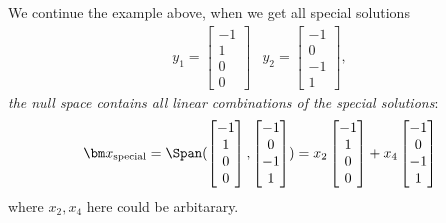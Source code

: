 \begin{itemize}
\begin{example}
We continue the example above, when we get all special solutions 
\[
\begin{array}{ll}
y_1 = \begin{bmatrix}
-1\\1\\0\\0
\end{bmatrix}
&
y_2 = \begin{bmatrix}
-1\\0\\-1\\1
\end{bmatrix},
\end{array}
\] 
\emph{the null space contains all linear combinations of the special solutions}:
\[
\bm x_{\text{special}} = \Span(\begin{bmatrix}
-1\\1\\0\\0
\end{bmatrix},\begin{bmatrix}
-1\\0\\-1\\1
\end{bmatrix}) = x_2\begin{bmatrix}
-1\\1\\0\\0
\end{bmatrix} + x_4\begin{bmatrix}
-1\\0\\-1\\1
\end{bmatrix}
\]
where $x_2,x_4$ here could be arbitarary.
\end{example}
\end{itemize}

